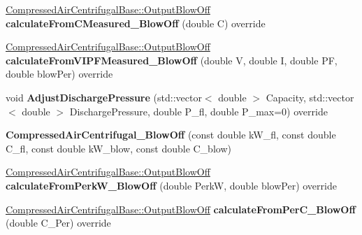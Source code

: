 \begin{DoxyCompactItemize}
\hyperlink{struct_compressed_air_centrifugal_base_1_1_output_blow_off}{Compressed\+Air\+Centrifugal\+Base\+::\+Output\+Blow\+Off} {\bfseries calculate\+From\+C\+Measured\+\_\+\+Blow\+Off} (double C) override
\item 
\mbox{\label{class_compressed_air_centrifugal___blow_off_afc4530f116e145fa5c09cd434211dba5}} 
\hyperlink{struct_compressed_air_centrifugal_base_1_1_output_blow_off}{Compressed\+Air\+Centrifugal\+Base\+::\+Output\+Blow\+Off} {\bfseries calculate\+From\+V\+I\+P\+F\+Measured\+\_\+\+Blow\+Off} (double V, double I, double PF, double blow\+Per) override
\item 
\mbox{\label{class_compressed_air_centrifugal___blow_off_acfb335ebe27d1108346f781084c1204b}} 
void {\bfseries Adjust\+Discharge\+Pressure} (std\+::vector$<$ double $>$ Capacity, std\+::vector$<$ double $>$ Discharge\+Pressure, double P\+\_\+fl, double P\+\_\+max=0) override
\item 
\mbox{\label{class_compressed_air_centrifugal___blow_off_a10619d63e61cde321c4a06c95182a680}} 
{\bfseries Compressed\+Air\+Centrifugal\+\_\+\+Blow\+Off} (const double k\+W\+\_\+fl, const double C\+\_\+fl, const double k\+W\+\_\+blow, const double C\+\_\+blow)
\item 
\mbox{\label{class_compressed_air_centrifugal___blow_off_a56daf95bed497c129f746779422bf1e9}} 
\hyperlink{struct_compressed_air_centrifugal_base_1_1_output_blow_off}{Compressed\+Air\+Centrifugal\+Base\+::\+Output\+Blow\+Off} {\bfseries calculate\+From\+Perk\+W\+\_\+\+Blow\+Off} (double PerkW, double blow\+Per) override
\item 
\mbox{\label{class_compressed_air_centrifugal___blow_off_af936835bda6d42e87cff50b09ddfbdc0}} 
\hyperlink{struct_compressed_air_centrifugal_base_1_1_output_blow_off}{Compressed\+Air\+Centrifugal\+Base\+::\+Output\+Blow\+Off} {\bfseries calculate\+From\+Per\+C\+\_\+\+Blow\+Off} (double C\+\_\+\+Per) override
\item 
\mbox{\label{class_compressed_air_centrifugal___blow_off_a389dc686d3f9b8f8307a11e203350f90}} 

\end{DoxyCompactItemize}
